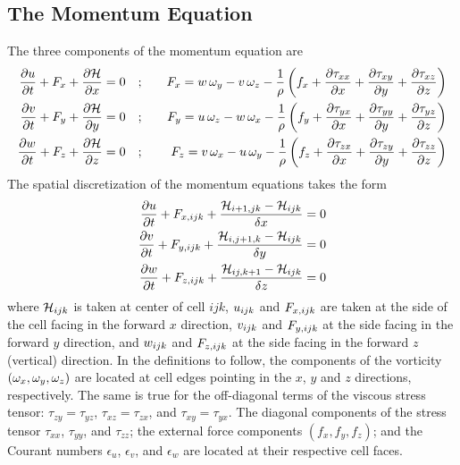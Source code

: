 \documentclass[11pt]{book}
\begin{document}
\clearpage
\subsection{The Momentum Equation}

\label{themom}

The three components of the momentum equation are
\begin{eqnarray}
\frac{\partial u}{\partial t} + F_x + \frac{\partial {\cal H}}{\partial x} = 0 \quad &;& \quad
F_x = w \, \omega_y - v \, \omega_z - \frac{1}{\rho} \left( f_x
  +  \frac{\partial \tau_{xx}}{\partial x} + \frac{\partial \tau_{xy}}{\partial y} + \frac{\partial \tau_{xz}}{\partial z} \right) \\
\frac{\partial v}{\partial t} + F_y + \frac{\partial {\cal H}}{\partial y} = 0 \quad &;& \quad
F_y = u \, \omega_z - w \, \omega_x - \frac{1}{\rho} \left( f_y
  +  \frac{\partial \tau_{yx}}{\partial x} + \frac{\partial \tau_{yy}}{\partial y} + \frac{\partial \tau_{yz}}{\partial z} \right) \\
\frac{\partial w}{\partial t} + F_z + \frac{\partial {\cal H}}{\partial z} = 0 \quad &;& \quad
F_z = v \, \omega_x - u \, \omega_y - \frac{1}{\rho} \left( f_z
  +  \frac{\partial \tau_{zx}}{\partial x} + \frac{\partial \tau_{zy}}{\partial y} + \frac{\partial \tau_{zz}}{\partial z} \right)
\end{eqnarray}
The spatial discretization of the momentum equations takes the form
\begin{eqnarray}
\frac{\partial u}{\partial t} + F_{x,ijk} + \frac{{\cal H}_{i+1,jk} -{\cal H}_{ijk}}{\delta x} = 0  \label{umom} \\
\frac{\partial v}{\partial t} + F_{y,ijk} + \frac{{\cal H}_{i,j+1,k}-{\cal H}_{ijk}}{\delta y} = 0  \label{vmom} \\
\frac{\partial w}{\partial t} + F_{z,ijk} + \frac{{\cal H}_{ij,k+1} -{\cal H}_{ijk}}{\delta z} = 0  \label{wmom}
\end{eqnarray}
where ${\cal H}_{ijk}$ is taken at center of cell $ijk$,
$u_{ijk}$ and $F_{x,ijk}$ are taken at the side of the cell facing
in the forward $x$ direction, $v_{ijk}$ and $F_{y,ijk}$ at the side
facing in the forward $y$ direction, and $w_{ijk}$ and $F_{z,ijk}$
at the side facing in the forward $z$ (vertical) direction. In the
definitions to follow, the components of the vorticity $(\omega_x,\omega_y,\omega_z)$
are located at cell edges pointing in the $x$, $y$ and $z$ directions,
respectively. The same is true for the off-diagonal terms of the viscous
stress tensor: $\tau_{zy}=\tau_{yz}$, $\tau_{xz}=\tau_{zx}$, and
$\tau_{xy}=\tau_{yx}$. The diagonal components of the stress
tensor $\tau_{xx}$, $\tau_{yy}$, and $\tau_{zz}$; the external force
components $(f_x,f_y,f_z)$; and the Courant numbers
$\epsilon_u$, $\epsilon_v$, and $\epsilon_w$ are located at their
respective cell faces.
\end{document}
